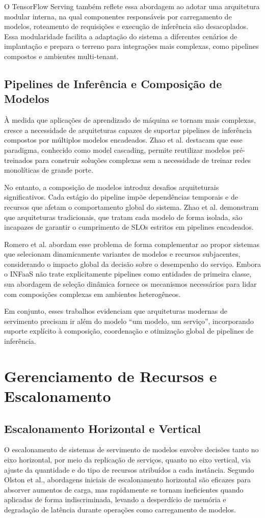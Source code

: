 O TensorFlow Serving também reflete essa abordagem ao adotar uma arquitetura modular interna, na qual componentes responsáveis por carregamento de modelos, roteamento de requisições e execução de inferência são desacoplados. Essa modularidade facilita a adaptação do sistema a diferentes cenários de implantação e prepara o terreno para integrações mais complexas, como pipelines compostos e ambientes multi-tenant.

\subsection{Pipelines de Inferência e Composição de Modelos}
À medida que aplicações de aprendizado de máquina se tornam mais complexas, cresce a necessidade de arquiteturas capazes de suportar pipelines de inferência compostos por múltiplos modelos encadeados. Zhao et al. destacam que esse paradigma, conhecido como model cascading, permite reutilizar modelos pré-treinados para construir soluções complexas sem a necessidade de treinar redes monolíticas de grande porte.

No entanto, a composição de modelos introduz desafios arquiteturais significativos. Cada estágio do pipeline impõe dependências temporais e de recursos que afetam o comportamento global do sistema. Zhao et al. demonstram que arquiteturas tradicionais, que tratam cada modelo de forma isolada, são incapazes de garantir o cumprimento de SLOs estritos em pipelines encadeados.

Romero et al. abordam esse problema de forma complementar ao propor sistemas que selecionam dinamicamente variantes de modelos e recursos subjacentes, considerando o impacto global da decisão sobre o desempenho do serviço. Embora o INFaaS não trate explicitamente pipelines como entidades de primeira classe, sua abordagem de seleção dinâmica fornece os mecanismos necessários para lidar com composições complexas em ambientes heterogêneos.

Em conjunto, esses trabalhos evidenciam que arquiteturas modernas de servimento precisam ir além do modelo “um modelo, um serviço”, incorporando suporte explícito à composição, coordenação e otimização global de pipelines de inferência.

\section{Gerenciamento de Recursos e Escalonamento}
\subsection{Escalonamento Horizontal e Vertical}
O escalonamento de sistemas de servimento de modelos envolve decisões tanto no eixo horizontal, por meio da replicação de serviços, quanto no eixo vertical, via ajuste da quantidade e do tipo de recursos atribuídos a cada instância. Segundo Olston et al., abordagens iniciais de escalonamento horizontal são eficazes para absorver aumentos de carga, mas rapidamente se tornam ineficientes quando aplicadas de forma indiscriminada, levando a desperdício de memória e degradação de latência durante operações como carregamento de modelos.

